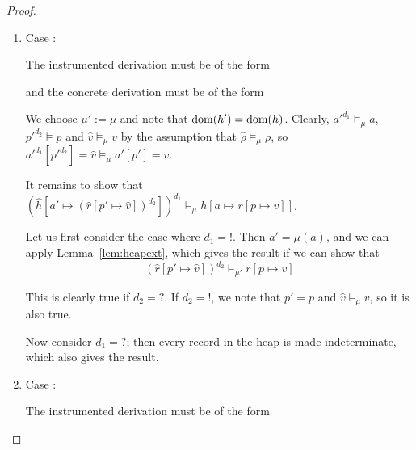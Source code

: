 \documentclass{article}
\begin{document}
\begin{proof}
\begin{enumerate}
\item Case :

  The instrumented derivation must be of the form

  \begin{prooftree}
     
  \end{prooftree}
  
  and the concrete derivation must be of the form

  \begin{prooftree}
  \end{prooftree}

  We choose $\mu':=\mu$ and note that $\dom(h')=\dom(h)$. Clearly, $a'^{d_1}\models_{\mu}a$, $p'^{d_2}\models p$ and $\hat{v}\models_{\mu}v$ by the assumption that $\hat{\rho}\models_{\mu}\rho$, so $a'^{d_1}[p'^{d_2}]=\hat{v}\models_{\mu}a'[p']=v$.

  It remains to show that $(\hat{h}[a'\mapsto (\hat{r}[p'\mapsto \hat{v}])^{d_2}])^{d_1}\models_{\mu}h[a\mapsto r[p\mapsto v]]$.

  Let us first consider the case where $d_1=!$. Then $a'=\mu(a)$, and we can apply Lemma~\ref{lem:heapext}, which gives the result if we can show that 
  $$(\hat{r}[p'\mapsto \hat{v}])^{d_2}\models_{\mu'}r[p\mapsto v]$$

  This is clearly true if $d_2=?$. If $d_2=!$, we note that $p'=p$ and $\hat{v}\models_{\mu}v$, so it is also true.

  Now consider $d_1=?$; then every record in the heap is made indeterminate, which also gives the result.

\item Case :

  The instrumented derivation must be of the form

  \begin{prooftree}
  \end{prooftree}


\end{enumerate}
\end{proof}
\end{document}
